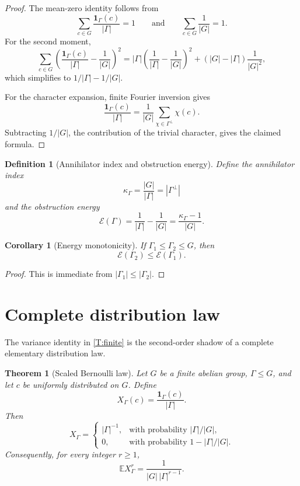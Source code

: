 \documentclass[11pt]{article}
\newtheorem{theorem}{Theorem}
\newtheorem{corollary}{Corollary}
\newtheorem{definition}{Definition}
\newcommand{\E}{\mathbb E}
\newcommand{\1}{\mathbf 1}
\begin{document}
\begin{proof}
The mean-zero identity follows from
\[
\sum_{c\in G}\frac{\1_\Gamma(c)}{|\Gamma|}=1
\qquad\text{and}\qquad
\sum_{c\in G}\frac1{|G|}=1.
\]
For the second moment,
\[
\sum_{c\in G}\left(\frac{\1_\Gamma(c)}{|\Gamma|}-\frac1{|G|}\right)^2
=
|\Gamma|\left(\frac1{|\Gamma|}-\frac1{|G|}\right)^2
+(|G|-|\Gamma|)\frac1{|G|^2},
\]
which simplifies to \(1/|\Gamma|-1/|G|\).

For the character expansion, finite Fourier inversion gives
\[
\frac{\1_\Gamma(c)}{|\Gamma|}
=
\frac1{|G|}\sum_{\chi\in\Gamma^\perp}\chi(c).
\]
Subtracting \(1/|G|\), the contribution of the trivial character, gives the claimed formula.
\end{proof}

\begin{definition}[Annihilator index and obstruction energy]
Define the annihilator index
\[
\kappa_\Gamma=\frac{|G|}{|\Gamma|}=|\Gamma^\perp|
\]
and the obstruction energy
\[
\mathcal E(\Gamma)=\frac1{|\Gamma|}-\frac1{|G|}
=
\frac{\kappa_\Gamma-1}{|G|}.
\]
\end{definition}

\begin{corollary}[Energy monotonicity]\label{C:energy-monotone}
If \(\Gamma_1\le\Gamma_2\le G\), then
\[
\mathcal E(\Gamma_2)\le \mathcal E(\Gamma_1).
\]
\end{corollary}

\begin{proof}
This is immediate from \(|\Gamma_1|\le|\Gamma_2|\).
\end{proof}

\section{Complete distribution law}

The variance identity in \cref{T:finite} is the second-order shadow of a complete elementary distribution law.

\begin{theorem}[Scaled Bernoulli law]\label{T:scaled-bernoulli}
Let \(G\) be a finite abelian group, \(\Gamma\le G\), and let \(c\) be uniformly distributed on \(G\).  Define
\[
X_\Gamma(c)=\frac{\1_\Gamma(c)}{|\Gamma|}.
\]
Then
\[
X_\Gamma=
\begin{cases}
|\Gamma|^{-1},&\text{with probability }|\Gamma|/|G|,\\
0,&\text{with probability }1-|\Gamma|/|G|.
\end{cases}
\]
Consequently, for every integer \(r\ge1\),
\[
\E X_\Gamma^r
=
\frac1{|G|\,|\Gamma|^{r-1}}.
\]
\end{theorem}
\end{document}
